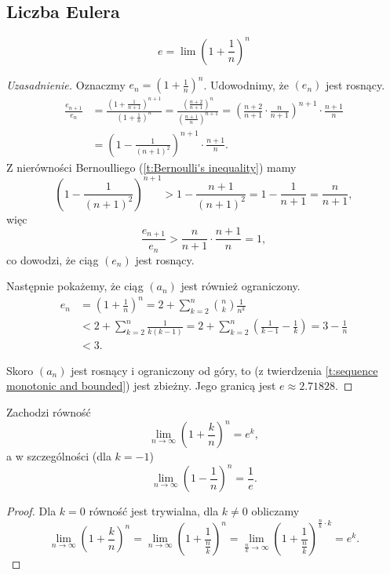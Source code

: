 \subsection{Liczba Eulera}
\begin{definition}
    \[ e = \lim \left(1 + \frac{1}{n}\right)^n \]
\end{definition}
\begin{proof}[Uzasadnienie]
    Oznaczmy $e_n = \left(1 + \frac{1}{n}\right)^n$. Udowodnimy, że $(e_n)$ jest rosnący.
    \[\begin{aligned}
        \frac{e_{n+1}}{e_n} &= \frac{\left(1 + \frac{1}{n+1}\right)^{n + 1}}{\left(1 + \frac{1}{n}\right)^n} = \frac{\left(\frac{n+ 2}{n+1}\right)^n}{\left(\frac{n+1}{n}\right)^{n+1}} = \left(\frac{n+2}{n+1} \cdot \frac{n}{n+1}\right)^{n+1} \cdot \frac{n+1}{n} \\
        &= \left(1 - \frac{1}{(n+1)^2}\right)^{n+1} \cdot \frac{n+1}{n}.
    \end{aligned}\]
    Z nierówności Bernoulliego (\ref{t:Bernoulli's inequality}) mamy
    \[ \left(1 - \frac{1}{(n+1)^2}\right)^{n+1} > 1 - \frac{n+1}{(n+1)^2} = 1 - \frac{1}{n+1} = \frac{n}{n+1}, \]
    więc
    \[ \frac{e_{n+1}}{e_n} > \frac{n}{n+1} \cdot \frac{n+1}{n} = 1, \]
    co dowodzi, że ciąg $(e_n)$ jest rosnący.

    Następnie pokażemy, że ciąg $(a_n)$ jest również ograniczony.
    \[\begin{aligned}
        e_n &= \left(1 + \frac{1}{n}\right)^n = 2 + \sum_{k=2}^n\binom{n}{k}\frac{1}{n^k} \\
        &< 2 + \sum_{k=2}^n\frac{1}{k(k-1)} = 2 + \sum_{k=2}^n\left(\frac{1}{k-1} - \frac{1}{k}\right) = 3 - \frac{1}{n} \\
        &< 3.
    \end{aligned}\]

    Skoro $(a_n)$ jest rosnący i ograniczony od góry, to (z twierdzenia \ref{t:sequence monotonic and bounded}) jest zbieżny. Jego granicą jest $e \approx 2.71828$.
\end{proof}

\begin{lemma}
    \label{l:lim e^k}
    Zachodzi równość
    \[ \lim_{n\to\infty}\left(1 + \frac{k}{n}\right)^n = e^k, \]
    a w szczególności (dla $k = -1$)
    \[ \lim_{n\to\infty}\left(1 - \frac{1}{n}\right)^n = \frac{1}{e}. \]
\end{lemma}
\begin{proof}
    Dla $k = 0$ równość jest trywialna, dla $k \neq 0$ obliczamy
    \[ \lim_{n\to\infty}\left(1 + \frac{k}{n}\right)^n = \lim_{n\to\infty}\left(1 + \frac{1}{\frac{n}{k}}\right)^n = \lim_{\frac{n}{k}\to\infty}\left(1 + \frac{1}{\frac{n}{k}}\right)^{\frac{n}{k} \cdot k} = e^k. \]
\end{proof}

